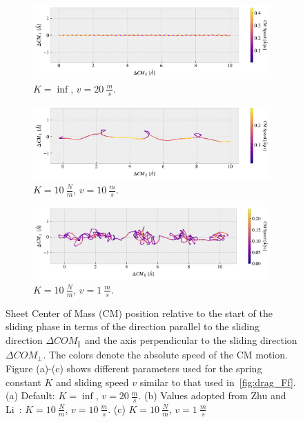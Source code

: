 \begin{figure}[H]
  \centering
  \begin{subfigure}[t]{0.85\textwidth}
    \centering
    \includegraphics[width=\textwidth]{figures/baseline/COM_path_K0.pdf}
    \caption{$K = \inf$, $v = \SI{20}{\frac{m}{s}}$.}
    \label{fig:CM_path_def}
  \end{subfigure}
  \hfill
  \begin{subfigure}[t]{0.85\textwidth}
    \centering
    \includegraphics[width=\textwidth]{figures/baseline/COM_path_K10_v10.pdf}
    \caption{$K = \SI{10}{\frac{N}{m}}$, $v = \SI{10}{\frac{m}{s}}$.}
    \label{fig:CM_path_K10_v10}
  \end{subfigure}
  \begin{subfigure}[t]{0.85\textwidth}
    \centering
    \includegraphics[width=\textwidth]{figures/baseline/COM_path_K10_v1.pdf}
    \caption{$K = \SI{10}{\frac{N}{m}}$, $v = \SI{1}{\frac{m}{s}}$.}
    \label{fig:CM_path_K10_v1}
  \end{subfigure}
  \caption{Sheet Center of Mass (\acrshort{CM}) position relative to the start of the sliding phase in terms of the direction parallel to the sliding direction $\Delta COM_{\parallel}$ and the axis perpendicular to the sliding direction $\Delta COM_{\perp}$. The colors denote the absolute speed of the \acrshort{CM} motion. Figure (a)-(c) shows different parameters used for the spring constant $K$ and sliding speed $v$ similar to that used in~\cref{fig:drag_Ff}. (a) Default: $K = \inf$, $v = \SI{20}{\frac{m}{s}}$. (b) Values adopted from Zhu
  and Li~\cite{zhu_study_2018}: $K = \SI{10}{\frac{N}{m}}$, $v = \SI{10}{\frac{m}{s}}$. (c) $K = \SI{10}{\frac{N}{m}}$, $v = \SI{1}{\frac{m}{s}}$ }
  \label{fig:CM_path}
\end{figure}


